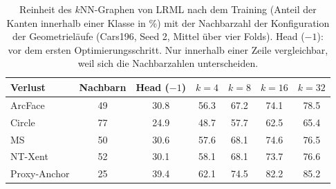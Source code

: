 \begin{table}[tbp]
\centering
\caption[Reinheit des $k$NN-Graphen von LRML]{Reinheit des $k$NN-Graphen von \acs{LRML} nach dem Training (Anteil der Kanten innerhalb einer Klasse in \%) mit der Nachbarzahl der Konfiguration der Geometrieläufe (Cars196, Seed 2, Mittel über vier Folds). Head ($-1$): vor dem ersten Optimierungsschritt. Nur innerhalb einer Zeile vergleichbar, weil sich die Nachbarzahlen unterscheiden.}
\label{tab:a:reinheit:lrml}
\begin{tabular}{@{}l S[table-format=2.0] S[table-format=2.1] S[table-format=2.1] S[table-format=2.1] S[table-format=2.1] S[table-format=2.1]@{}}
\toprule
{Verlust} & {Nachbarn} & {Head ($-1$)} & {$k=4$} & {$k=8$} & {$k=16$} & {$k=32$} \\
\midrule
ArcFace & 49 & 30.8 & 56.3 & 67.2 & 74.1 & 78.5 \\
Circle & 77 & 24.9 & 48.7 & 57.7 & 62.5 & 65.4 \\
\acs{MS} & 50 & 30.6 & 57.6 & 68.1 & 74.6 & 76.5 \\
NT-Xent & 52 & 30.1 & 58.1 & 68.1 & 73.7 & 76.6 \\
Proxy-Anchor & 25 & 39.4 & 62.1 & 74.5 & 82.2 & 85.2 \\
\bottomrule
\end{tabular}
\end{table}
